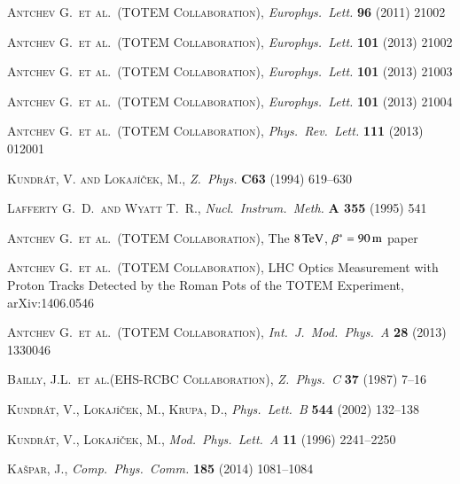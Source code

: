 \documentclass[3p,twocolumn]{elsarticle}
\def\un#1{\,{\rm #1}}
\def\etal{et al.}
\def\Name#1{\textsc{#1}, }
\def\REVIEW#1#2#3#4{{\it #1} {\bf #2} (#3) #4}
\begin{document}
\begin{thebibliography}{99}
	\Name{Antchev G.~\etal{}~(TOTEM Collaboration)}
	\REVIEW{Europhys.~Lett.}{96}{2011}{21002}

	\Name{Antchev G.~\etal{}~(TOTEM Collaboration)}
	\REVIEW{Europhys.~Lett.}{101}{2013}{21002}

	\Name{Antchev G.~\etal{}~(TOTEM Collaboration)}
	\REVIEW{Europhys.~Lett.}{101}{2013}{21003}

	\Name{Antchev G.~\etal{}~(TOTEM Collaboration)}
	\REVIEW{Europhys.~Lett.}{101}{2013}{21004}

	\Name{Antchev G.~\etal{}~(TOTEM Collaboration)}
	\REVIEW{Phys.~Rev.~Lett.}{111}{2013}{012001}

	\Name{Kundr\' at, V. and Lokaj\' i\v cek, M.}
	\REVIEW{Z.~Phys.}{C63}{1994}{619--630}

	\Name{Lafferty G.~D.~and Wyatt T.~R.}
	\REVIEW{Nucl.\ Instrum.\ Meth.}{A 355}{1995}{541}

	\Name{Antchev G.~\etal{}~(TOTEM Collaboration)}
	The $8\un{TeV}$, $\beta^* = 90\un{m}$ paper

	\Name{Antchev G.~\etal{}~(TOTEM Collaboration)}
	LHC Optics Measurement with Proton Tracks Detected by the Roman Pots of the TOTEM Experiment, 
	arXiv:1406.0546

	\Name{Antchev G.~\etal{}~(TOTEM Collaboration)}
	\REVIEW{Int.~J.~Mod.~Phys.~A}{28}{2013}{1330046}

	\Name{Bailly, J.L.~\etal{}(EHS-RCBC Collaboration)}
	\REVIEW{Z.~Phys.~C}{37}{1987}{7--16}

	\Name{Kundr\' at, V., Lokaj\' i\v cek, M., Krupa, D.}
	\REVIEW{Phys.~Lett.~B}{544}{2002}{132--138}

	\Name{Kundr\' at, V., Lokaj\' i\v cek, M.}
	\REVIEW{Mod.~Phys.~Lett.~A}{11}{1996}{2241--2250}

	\Name{Ka\v spar, J.}
	\REVIEW{Comp.~Phys.~Comm.}{185}{2014}{1081--1084}

\end{thebibliography}
\end{document}

